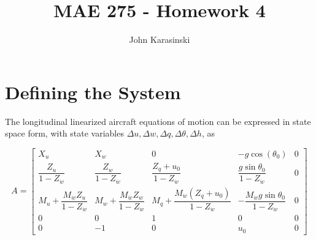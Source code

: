 \documentclass[12pt]{article}
\title{MAE 275 - Homework 4}
\author{John Karasinski}
\begin{document}
\maketitle

\section{Defining the System}
The longitudinal linearized aircraft equations of motion can be expressed in state space form, with state variables $\Delta u, \Delta w, \Delta q, \Delta \theta, \Delta h$, as

\begin{equation*}
A =
\begin{bmatrix}
    X_u & X_w & 0 & -g \cos(\theta_0) & 0 \\
    \dfrac{Z_u}{1-Z_{\dot{w}}} & \dfrac{Z_w}{1-Z_{\dot{w}}} & \dfrac{Z_q + u_0}{1-Z_{\dot{w}}} & \dfrac{g\sin \theta_0}{1-Z_{\dot{w}}} & 0 \\
    M_u + \dfrac{M_{\dot{w}} Z_u}{1-Z_{\dot{w}}} & M_w + \dfrac{M_{\dot{w}} Z_w}{1-Z_{\dot{w}}} & M_q + \dfrac{M_{\dot{w}} (Z_q + u_0)}{1-Z_{\dot{w}}} & -\dfrac{M_{\dot{w}} g\sin \theta_0}{1-Z_{\dot{w}}} & 0 \\
    0 & 0 & 1 & 0 & 0 \\
    0 & -1 & 0 & u_0 & 0
\end{bmatrix}
\end{equation*}
\end{document}
